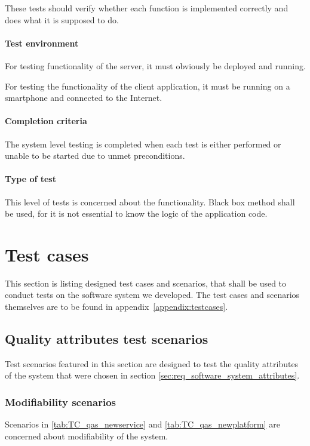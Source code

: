 \documentclass[11pt]{book}
\begin{document}
These tests should verify whether each function is implemented correctly and does what it is supposed to do.

\paragraph{Test environment}
For testing functionality of the server, it must obviously be deployed and running.

For testing the functionality of the client application, it must be running on a smartphone and connected to the Internet.

\paragraph{Completion criteria}
The system level testing is completed when each test is either performed or unable to be started due to unmet preconditions.

\paragraph{Type of test}
This level of tests is concerned about the functionality. Black box method shall be used, for it is not essential to know the logic of the application code. 


\section{Test cases} \label{sec:test_cases}

This section is listing designed test cases and scenarios, that shall be used to conduct tests on the software system we developed. The test cases and scenarios themselves are to be found in appendix~\ref{appendix:testcases}.

\subsection{Quality attributes test scenarios}\label{sec:qatestscenarios}
Test scenarios featured in this section are designed to test the quality attributes of the system that were chosen in section \ref{sec:req_software_system_attributes}.

\subsubsection{Modifiability scenarios}
Scenarios in \ref{tab:TC_qas_newservice} and \ref{tab:TC_qas_newplatform} are concerned about modifiability of the system.
\end{document}
